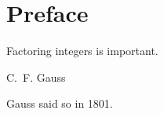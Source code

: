 \documentclass{gsm-l}
\begin{document}
\chapter*{Preface}

\leavevmode
\epigraph
{Factoring integers is important.}{%
C.~F. Gauss}
Gauss said so in 1801.
\end{document}

